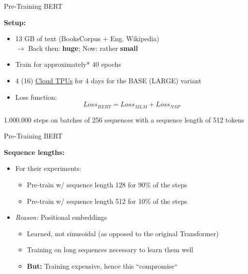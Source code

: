 
\begin{frame}{Pre-Training BERT}

\vfill

\textbf{Setup:}

\begin{itemize}
	\item 13 GB of text (BooksCorpus $+$ Eng. Wikipedia)\\
				$\rightarrow$ Back then: \textbf{huge}; Now: rather \textbf{small}
	\item Train for approximately* 40 epochs
	\item 4 (16) \href{https://cloud.google.com/tpu/}{Cloud TPUs} for 4 days for the BASE (LARGE) variant
	\item Loss function: $$Loss_{BERT} = Loss_{MLM} + Loss_{NSP}$$
\end{itemize}

\vfill

{\scriptsize *1.000.000 steps on batches of 256 sequences with a sequence length of 512 tokens}
\end{frame}


\begin{frame}{Pre-Training BERT}

\vfill

\textbf{Sequence lengths:}

\begin{itemize}
	\item For their experiments:
		\begin{itemize}
			\item Pre-train w/ sequence length 128 for 90\% of the steps
			\item Pre-train w/ sequence length 512 for 10\% of the steps \\
		\end{itemize}
	\item \textit{Reason:} Positional embeddings
		\begin{itemize}
			\item Learned, not sinusoidal (as opposed to the original Transformer)
			\item Training on long sequences necessary to learn them well
			\item \textbf{But:} Training expensive, hence this ``compromise``
		\end{itemize}
\end{itemize}

\vfill

\end{frame}

